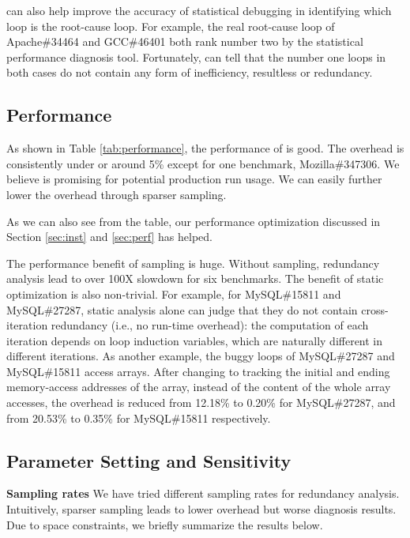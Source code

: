 \Tool can also help improve the accuracy of statistical debugging in
identifying which loop is the root-cause loop.
For example, the real root-cause loop of Apache\#34464 and GCC\#46401 both
rank number two by the statistical performance diagnosis tool.
Fortunately,
\Tool can tell that the number one loops in both cases do not contain
any form of inefficiency, resultless or redundancy. 

\subsection{Performance}
\label{sec:result_perf}



As shown in Table \ref{tab:performance}, 
the performance of \Tool is good. The overhead is consistently under or around 5\% 
except for one benchmark, Mozilla\#347306. 
We believe \Tool is promising for potential production
run usage.
We can easily further lower the overhead through sparser sampling.

As we can also see from the table, our performance optimization discussed in 
Section \ref{sec:inst} and \ref{sec:perf} has helped.

The performance benefit of sampling is huge.
Without sampling, redundancy
analysis lead to over 100X slowdown for six benchmarks.
The benefit of static optimization is also non-trivial. 
For example, for MySQL\#15811 and MySQL\#27287, static analysis alone can
judge that they do not contain cross-iteration redundancy (i.e., no run-time 
overhead): the computation of 
each iteration depends on loop induction variables, which are naturally different
in different iterations. 
As another example, the buggy loops of MySQL\#27287 and MySQL\#15811 access 
arrays. 
After changing to tracking the initial and ending memory-access addresses
of the array, instead of the content of the whole array accesses,
the overhead is reduced from 12.18\% to 0.20\% for MySQL\#27287, 
and from 20.53\% to 0.35\% for MySQL\#15811 respectively. 

\subsection{Parameter Setting and Sensitivity}
\label{sec:sensi}
\noindent\textbf{Sampling rates}
We have tried different sampling rates for redundancy analysis.
Intuitively, sparser sampling leads to lower overhead but worse diagnosis
results. Due to space constraints, we briefly summarize the results below.

